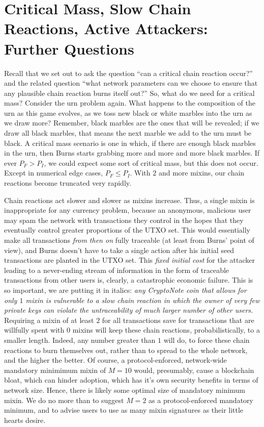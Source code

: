 \documentclass{mrl}
\begin{document}
\section{Critical Mass, Slow Chain Reactions, Active Attackers: Further Questions}

Recall that we set out to ask the question ``can a critical chain reaction occur?'' and the related question ``what network parameters can we choose to ensure that any plausible chain reaction burns itself out?'' So, what do we need for a critical mass? Consider the urn problem again. What happens to the composition of the urn as this game evolves, as we toss new black or white marbles into the urn as we draw more? Remember, black marbles are the ones that will be revealed; if we draw all black marbles, that means the next marble we add to the urn must be black. A critical mass scenario is one in which, if there are enough black marbles in the urn, then Burns starts grabbing more and more and more black marbles. If ever $P_F > P_I$, we could expect some sort of critical mass, but this does not occur. Except in numerical edge cases, $P_F \leq P_I$. With $2$ and more mixins, our chain reactions become truncated very rapidly.

Chain reactions act slower and slower as mixins increase. Thus, a single mixin is inappropriate for any currency problem, because an anonymous, malicious user may spam the network with transactions they control in the hopes that they eventually control greater proportions of the UTXO set. This would essentially make all transactions \emph{from then on} fully traceable (at least from Burns' point of view), and Burns doesn't have to take a single action after his initial seed transactions are planted in the UTXO set. This \emph{fixed initial cost} for the attacker leading to a never-ending stream of information in the form of traceable transactions from other users is, clearly, a catastrophic economic failure. This is so important, we are putting it in italics: \emph{any CryptoNote coin that allows for only $1$ mixin is vulnerable to a slow chain reaction in which the owner of very few private keys can violate the untraceability of much larger number of other users.} Requiring a mixin of at least $2$ for all transactions save for transactions that are willfully spent with $0$ mixins will keep these chain reactions, probabilistically, to a smaller length. Indeed, any number greater than $1$ will do, to force these chain reactions to burn themselves out, rather than to spread to the whole network, and the higher the better. Of course, a protocol-enforced, network-wide mandatory minimimum mixin of $M=10$ would, presumably, cause a blockchain bloat, which can hinder adoption, which has it's own security benefits in terms of network size. Hence, there is likely some optimal size of mandatory minimum mixin. We do no more than to suggest $M=2$ as a protocol-enforced mandatory minimum, and to advise users to use as many mixin signatures as their little hearts desire.
\end{document}
